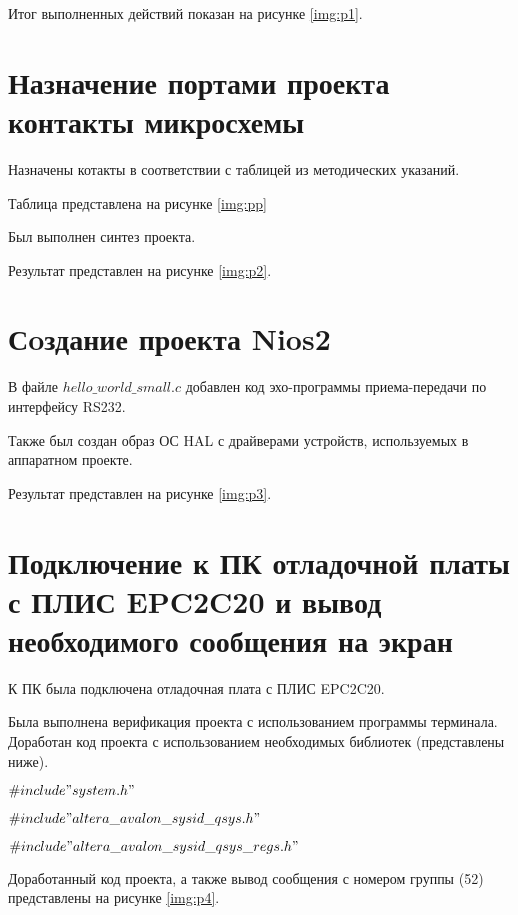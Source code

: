 Итог выполненных действий показан на рисунке \ref{img:p1}.

\clearpage

\section*{Назначение портами проекта контакты микросхемы} 

Назначены котакты в соответствии с таблицей из методических указаний. 

Таблица представлена на рисунке \ref{img:pp}




Был выполнен синтез проекта.

Результат представлен на рисунке \ref{img:p2}.

\clearpage

\section*{Сoздание проекта Nios2}


В файле  $hello\_world\_small.c$ добавлен код эхо-программы приема-передачи по интерфейсу RS232.

Также был создан образ ОС HAL с драйверами устройств, используемых в аппаратном проекте.

Результат представлен на рисунке \ref{img:p3}.

\clearpage

\section*{Подключение к ПК отладочной платы с ПЛИС EPC2C20 и вывод необходимого сообщения на экран}
К ПК была подключена отладочная плата с ПЛИС EPC2C20.


Была выполнена верификация проекта с использованием программы терминала. Доработан код проекта с использованием необходимых библиотек (представлены ниже).

 $\#include "system.h"$
 
 $\#include "altera\_avalon\_sysid\_qsys.h"$
 
 $\#include "altera\_avalon\_sysid\_qsys\_regs.h"$
 
 
Доработанный код проекта, а также вывод сообщения с номером группы (52) представлены на рисунке \ref{img:p4}.

\clearpage
